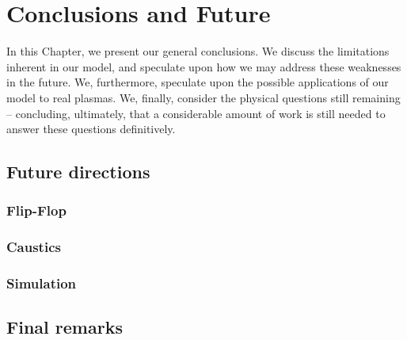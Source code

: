 
\chapter{Conclusions and Future}

In this Chapter, we present our general conclusions. We discuss the limitations inherent
in our model, and speculate upon how we may address these weaknesses in the future.
We, furthermore, speculate upon the possible applications of our model to real plasmas.
We, finally, consider the physical questions still remaining – concluding, ultimately, that a
considerable amount of work is still needed to answer these questions definitively.

\section{Future directions}

\subsection{Flip-Flop}
\subsection{Caustics}
\subsection{Simulation}


\section{Final remarks}
